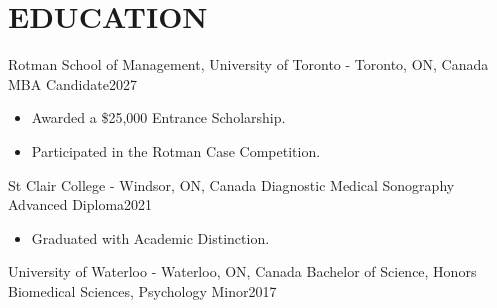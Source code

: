 
\section{\textcolor{airforceblue}{EDUCATION}}
  \employmentSubheadingListStart
    \employmentSubheading
      {Rotman School of Management, University of Toronto - Toronto, ON, Canada}{}
      {MBA Candidate}{2027}
      \begin{itemize}[leftmargin=1.5em]
        \item Awarded a \$25,000 Entrance Scholarship.
        \item Participated in the Rotman Case Competition.
      \end{itemize}
    \employmentSubheading
      {St Clair College - Windsor, ON, Canada}{}
      {Diagnostic Medical Sonography Advanced Diploma}{2021}
      \begin{itemize}[leftmargin=1.5em]
        \item Graduated with Academic Distinction.
      \end{itemize}
    \employmentSubheading
      {University of Waterloo - Waterloo, ON, Canada}{}
      {Bachelor of Science, Honors Biomedical Sciences, Psychology Minor}{2017}
  \employmentSubheadingListEnd
  \vspace{-10pt}
